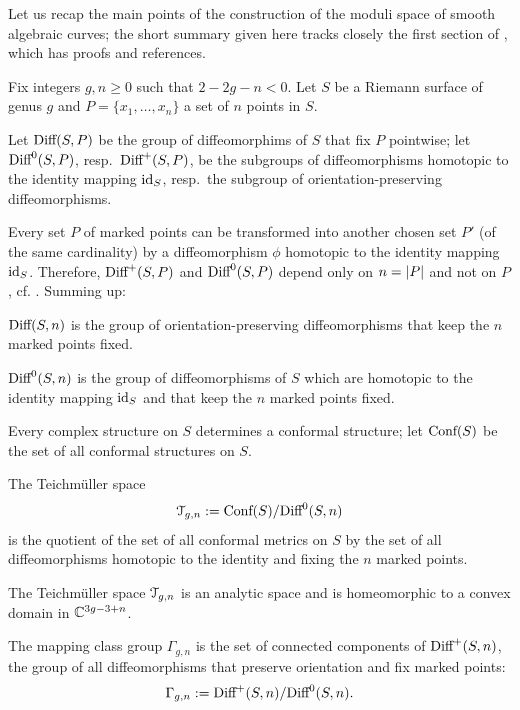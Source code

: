 Let us recap the main points of the construction of the moduli space
of smooth algebraic curves; the short summary given here tracks
closely the first section of \cite{looijenga;cellular-decomposition},
which has proofs and references.

Fix integers $g,n\geq0$ such that $2 -2g - n < 0$. Let $S$ be a Riemann
surface of genus $g$ and $P = \{ x_1, \ldots, x_n \}$ a set of $n$ points
in $S$.  

Let $\textrm{Diff}(S,P)$ be the group of diffeomorphims of $S$ that fix $P$
pointwise; let $\textrm{Diff}^0(S,P)$, resp.~$\textrm{Diff}^+(S,P)$, be the subgroups
of diffeomorphisms homotopic to the identity mapping $\operatorname{id}_S$,
resp.~the subgroup of orientation-preserving diffeomorphisms.

Every set $P$ of marked points can be transformed into another chosen
set $P'$ (of the same cardinality) by a diffeomorphism $\phi$
homotopic to the identity mapping $\operatorname{id}_S$.  Therefore, $\textrm{Diff}^+(S,P)$
and $\textrm{Diff}^0(S, P)$ depend only on $n = \lvert P\rvert$ and not on $P$,
cf. \cite{krushkal;riemann-surfaces}.  Summing up:
\begin{definition}\label{dfn:diff}
  $\textrm{Diff}(S,n)$ is the group of orientation-preserving diffeomorphisms
  that keep the $n$ marked points fixed.

  $\textrm{Diff}^0(S,n)$ is the group of diffeomorphisms of $S$ which are
  homotopic to the identity mapping $\operatorname{id}_S$ and that keep the $n$
  marked points fixed.
\end{definition}

Every complex structure  on $S$ determines a conformal structure; let
$\text{\rm Conf}(S)$ be the set of all conformal structures on $S$. 
\begin{definition}\label{dfn:teichmuller}
  The Teichm{\"u}ller space
  \begin{equation*}
    \mathcal{T}_{g,n} := \text{\rm Conf}(S) / \textrm{Diff}^0(S, n)
  \end{equation*}
  is the quotient of the set of all conformal metrics on $S$ by the
  set of all diffeomorphisms homotopic to the identity and fixing the
  $n$ marked points.
\end{definition}
The Teichm{\"u}ller space $\mathcal{T}_{g,n}$ is an analytic space and is
homeomorphic to a convex domain in $\mathbb{C}^{3g - 3 + n}$.

\begin{definition}\label{dfn:mapping-class-group}
  The mapping class group $\Gamma_{g,n}$ is the set of connected components
  of $\textrm{Diff}^+(S, n)$, the group of all diffeomorphisms that preserve
  orientation and fix marked points:
  \begin{equation*}
    \Gamma_{g,n} := \textrm{Diff}^+ (S, n) / \textrm{Diff}^0(S, n).
  \end{equation*}
\end{definition}



